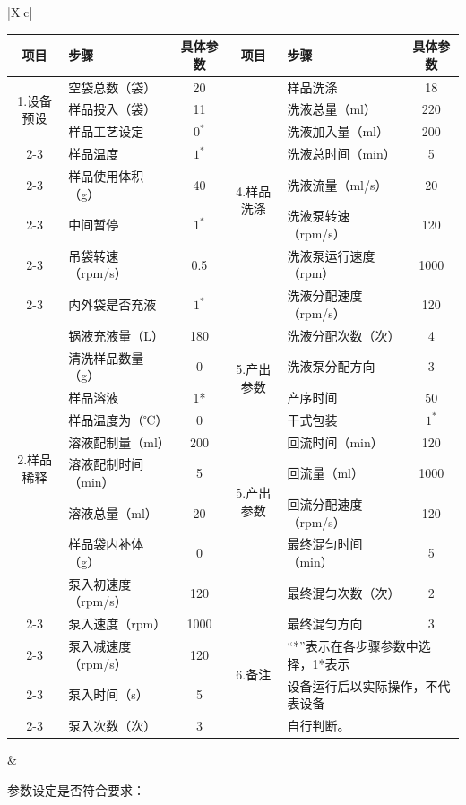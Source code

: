 \documentclass[UTF8,10pt,a4paper,fontset=fandol]{ctexart}
\begin{document}
\begin{tabularx}{\textwidth}{|X|c|}
\begin{minipage}[t]{0.96\linewidth}
\vspace{3pt}
\scriptsize
{
\begin{tabularx}{\linewidth}{|c|X|c|c|X|c|}
\hline
\textbf{项目} & \textbf{步骤} & \textbf{具体参数} & \textbf{项目} & \textbf{步骤} & \textbf{具体参数} \\
\hline
\multirow{3}{*}{1.设备预设}
& 空袋总数（袋） & 20
& \multirow{8}{*}{4.样品洗涤}
& 样品洗涤 & 18 \\
\cline{2-3}\cline{5-6}
& 样品投入（袋） & 11
& & 洗液总量（ml） & 220 \\
\cline{2-3}\cline{5-6}
& 样品工艺设定 & $0^{*}$
& & 洗液加入量（ml） & 200 \\
\cline{2-3}\cline{5-6}
& 样品温度 & $1^{*}$
& & 洗液总时间（min） & 5 \\
\cline{2-3}\cline{5-6}
& 样品使用体积（g） & 40
& & 洗液流量（ml/s） & 20 \\
\cline{2-3}\cline{5-6}
& 中间暂停 & $1^{*}$
& & 洗液泵转速（rpm/s） & 120 \\
\cline{2-3}\cline{5-6}
& 吊袋转速（rpm/s） & 0.5
& & 洗液泵运行速度（rpm） & 1000 \\
\cline{2-3}\cline{5-6}
& 内外袋是否充液 & $1^{*}$
& & 洗液分配速度（rpm/s） & 120 \\
\hline
\multirow{9}{*}{2.样品稀释}
& 锅液充液量（L） & 180
& \multirow{4}{*}{5.产出参数}
& 洗液分配次数（次） & 4 \\
\cline{2-3}\cline{5-6}
& 清洗样品数量（g） & 0
& & 洗液泵分配方向 & 3 \\
\cline{2-3}\cline{5-6}
& 样品溶液 & 1*
& & 产序时间 & 50 \\
\cline{2-3}\cline{5-6}
& 样品温度为（℃） & 0
& & 干式包装 & $1^{*}$ \\
\cline{2-3}\cline{5-6}
& 溶液配制量（ml） & 200
& \multirow{4}{*}{5.产出参数}
& 回流时间（min） & 120 \\
\cline{2-3}\cline{5-6}
& 溶液配制时间（min） & 5
& & 回流量（ml） & 1000 \\
\cline{2-3}\cline{5-6}
& 溶液总量（ml） & 20
& & 回流分配速度（rpm/s） & 120 \\
\cline{2-3}\cline{5-6}
& 样品袋内补体（g） & 0
& & 最终混匀时间（min） & 5 \\
\cline{2-3}\cline{5-6}
& 泵入初速度（rpm/s） & 120
& & 最终混匀次数（次） & 2 \\
\cline{2-3}\cline{5-6}
& 泵入速度（rpm） & 1000
& & 最终混匀方向 & 3 \\
\cline{2-3}
& 泵入减速度（rpm/s） & 120
& \multirow{2}{*}{6.备注}
& \multicolumn{2}{l|}{“*”表示在各步骤参数中选择，1*表示}\\
\cline{2-3}
& 泵入时间（s） & 5
& & \multicolumn{2}{l|}{设备运行后以实际操作，不代表设备}\\
\cline{2-3}
& 泵入次数（次） & 3
& & \multicolumn{2}{l|}{自行判断。}\\
\hline
\end{tabularx}
}
\normalsize
\vspace{3pt}
\end{minipage}
&
\begin{minipage}[t]{0.96\linewidth}
\vspace{55pt}
参数设定是否符合要求：


\end{minipage}
\end{tabularx}
\end{document}
